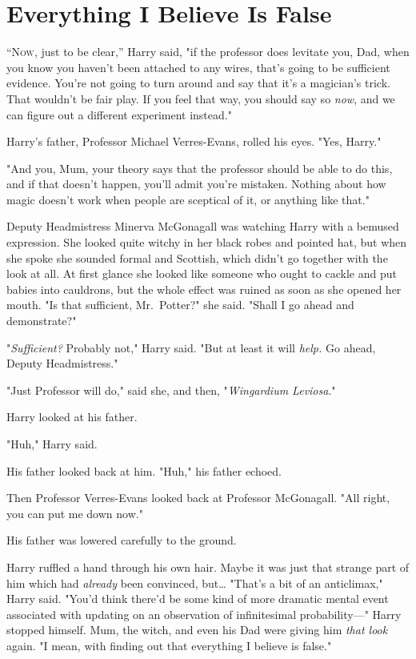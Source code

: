 \chapter{Everything I Believe Is False}

\lettrine{“N}{ow}, just to be clear,'' Harry said, "if the professor does levitate you, Dad,
when you know you haven't been attached to any wires, that's going to be
sufficient evidence. You're not going to turn around and say that it's a
magician's trick. That wouldn't be fair play. If you feel that way, you should
say so \emph{now}, and we can figure out a different experiment instead."

Harry's father, Professor Michael Verres-Evans, rolled his eyes. "Yes, Harry."

"And you, Mum, your theory says that the professor should be able to do this,
and if that doesn't happen, you'll admit you're mistaken. Nothing about how
magic doesn't work when people are sceptical of it, or anything like that."

Deputy Headmistress Minerva McGonagall was watching Harry with a bemused
expression. She looked quite witchy in her black robes and pointed hat, but
when she spoke she sounded formal and Scottish, which didn't go together with
the look at all. At first glance she looked like someone who ought to cackle
and put babies into cauldrons, but the whole effect was ruined as soon as she
opened her mouth. "Is that sufficient, Mr.~Potter?" she said. "Shall I go ahead
and demonstrate?"

"\emph{Sufficient?} Probably not," Harry said. "But at least it will
\emph{help.} Go ahead, Deputy Headmistress."

"Just Professor will do," said she, and then, "\emph{Wingardium Leviosa}."

Harry looked at his father.

"Huh," Harry said.

His father looked back at him. "Huh," his father echoed.

Then Professor Verres-Evans looked back at Professor McGonagall. "All right,
you can put me down now."

His father was lowered carefully to the ground.

Harry ruffled a hand through his own hair. Maybe it was just that strange part
of him which had \emph{already} been convinced, but{\ldots} "That's a bit of an
anticlimax," Harry said. "You'd think there'd be some kind of more dramatic
mental event associated with updating on an observation of infinitesimal
probability---" Harry stopped himself. Mum, the witch, and even his Dad were
giving him \emph{that look} again. "I mean, with finding out that everything I
believe is false."

